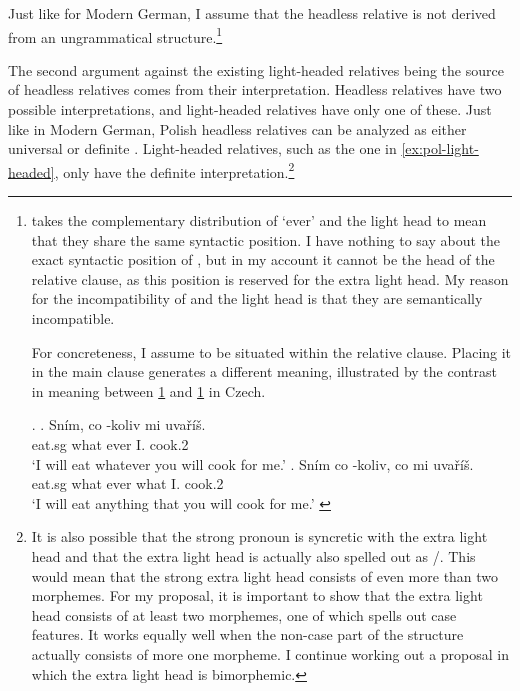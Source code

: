 Just like for Modern German, I assume that the headless relative is not derived from an ungrammatical structure.\footnote{
\citet{citko2004} takes the complementary distribution of  `ever' and the light head to mean that they share the same syntactic position. I have nothing to say about the exact syntactic position of , but in my account it cannot be the head of the relative clause, as this position is reserved for the extra light head. My reason for the incompatibility of  and the light head is that they are semantically incompatible.

For concreteness, I assume  to be situated within the relative clause. Placing it in the main clause generates a different meaning, illustrated by the contrast in meaning between \ref{ex:cz-wh-ever} and \ref{ex:cz-ever-wh} in Czech.

\ex.
\ag. Sním, co -koliv mi uvaříš.\\
 eat.sg what ever I. cook.2\\
 `I will eat whatever you will cook for me.'\label{ex:cz-wh-ever}
\bg. Sním co -koliv, co mi uvaříš.\\
 eat.sg what ever what I. cook.2\\
 `I will eat anything that you will cook for me.' \label{ex:cz-ever-wh}

\phantom{x}
}

The second argument against the existing light-headed relatives being the source of headless relatives comes from their interpretation. Headless relatives have two possible interpretations, and light-headed relatives have only one of these.
Just like in Modern German, Polish headless relatives can be analyzed as either universal or definite .
Light-headed relatives, such as the one in \ref{ex:pol-light-headed}, only have the definite interpretation.\footnote{
It is also possible that the strong pronoun is syncretic with the extra light head and that the extra light head is actually also spelled out as /. This would mean that the strong extra light head consists of even more than two morphemes. For my proposal, it is important to show that the extra light head consists of at least two morphemes, one of which spells out case features. It works equally well when the non-case part of the structure actually consists of more one morpheme. I continue working out a proposal in which the extra light head is bimorphemic.
}

